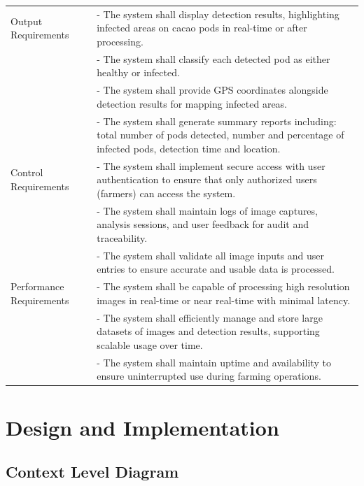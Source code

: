 \begin{longtable}{p{4cm} p{8cm}}
    	Output Requirements & - The system shall display detection results, highlighting infected areas on cacao pods in real-time or after processing. \\
    	& - The system shall classify each detected pod as either healthy or infected. \\
    	& - The system shall provide GPS coordinates alongside detection results for mapping infected areas. \\
    	& - The system shall generate summary reports including: total number of pods detected, number and percentage of infected pods, detection time and location. \\
    	\midrule
    	
    	Control Requirements & - The system shall implement secure access with user authentication to ensure that only authorized users (farmers) can access the system. \\
    	& - The system shall maintain logs of image captures, analysis sessions, and user feedback for audit and traceability. \\
    	& - The system shall validate all image inputs and user entries to ensure accurate and usable data is processed. \\
    	\midrule
    	
    	Performance Requirements & - The system shall be capable of processing high resolution images in real-time or near real-time with minimal latency. \\
    	& - The system shall efficiently manage and store large datasets of images and detection results, supporting scalable usage over time. \\
    	& - The system shall maintain uptime and availability to ensure uninterrupted use during farming operations. \\
    \end{longtable}
    
	\section{Design and Implementation} 
	
	\subsection{Context Level Diagram}
	
